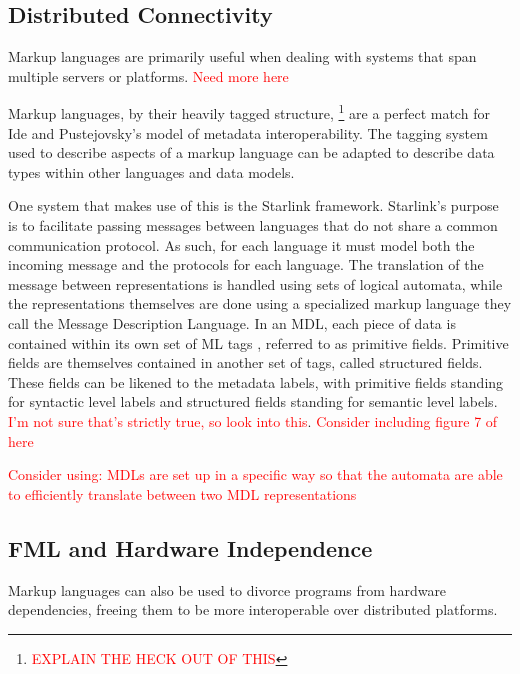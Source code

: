 \documentclass{sig-alternate}
\newcommand{\mycomment}[1]{\textcolor{red}{#1}}
\begin{document}
\subsection*{Distributed Connectivity}
Markup languages are primarily useful when dealing with systems that span multiple servers or platforms. \mycomment{Need more here}

Markup languages, by their heavily tagged structure, \footnote{\mycomment{EXPLAIN THE HECK OUT OF THIS}} are a perfect match for Ide and Pustejovsky's model of metadata interoperability.\cite{Ide:2010} The tagging system used to describe aspects of a markup language can be adapted to describe data types within other languages and data models.

One system that makes use of this is the Starlink framework\cite{Bromberg:2011}. Starlink's purpose is to facilitate passing messages between languages that do not share a common communication protocol. As such, for each language it must model both the incoming message and the protocols for each language.
The translation of the message between representations is handled using sets of logical automata, while the representations themselves are done using a specialized markup language they call the Message Description Language. In an MDL, each piece of data is contained within its own set of ML tags , referred to as primitive fields. Primitive fields are themselves contained in another set of tags, called structured fields. These fields can be likened to the metadata labels, with primitive fields standing for syntactic level labels and structured fields standing for semantic level labels. \mycomment{I'm not sure that's strictly true, so look into this}.
\mycomment{Consider including figure 7 of \cite{Bromberg:2011} here}

\mycomment{Consider using: MDLs are set up in a specific way so that the automata are able to efficiently translate between two MDL representations}


\subsection*{FML and Hardware Independence}

Markup languages can also be used to divorce programs from hardware dependencies, freeing them to be more interoperable over distributed platforms.
\end{document}
